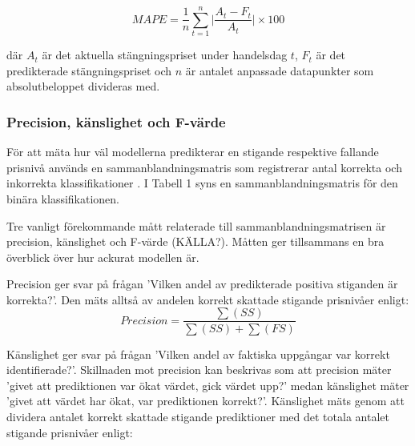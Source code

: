 \documentclass[12pt]{article}
\begin{document}
\begin{equation*}
    \textit{MAPE}=\frac{1}{n} 
    \sum_{t=1}^{n} \vert \frac{A_{t}-F_{t}}{A_{t}} \vert \times 100
\end{equation*}

där $A_{t}$ är det aktuella stängningspriset under handelsdag $t$, $F_{t}$ är det predikterade stängningspriset och $n$ är antalet anpassade datapunkter som absolutbeloppet divideras med. 

\subsubsection{Precision, känslighet och F-värde}
För att mäta hur väl modellerna predikterar en stigande respektive fallande prisnivå används en sammanblandningsmatris som registrerar antal korrekta och inkorrekta klassifikationer \parencite{ModelValidation}. I Tabell 1 syns en sammanblandningsmatris för den binära klassifikationen. 

\begin{table}[H]
\caption{Binär klassifikation}
\end{table}

Tre vanligt förekommande mått relaterade till sammanblandningsmatrisen är precision, känslighet och F-värde (KÄLLA?). Måtten ger tillsammans en bra överblick över hur ackurat modellen är.

\par Precision ger svar på frågan 'Vilken andel av predikterade positiva stiganden är korrekta?'. Den mäts alltså av andelen korrekt skattade stigande prisnivåer enligt:
\begin{equation}
    \textit{Precision} = \frac{\sum(SS)}{\sum(SS)+\sum(FS)} 
\end{equation}

Känslighet ger svar på frågan 'Vilken andel av faktiska uppgångar var korrekt identifierade?'. Skillnaden mot precision kan beskrivas som att precision mäter 'givet att prediktionen var ökat värdet, gick värdet upp?' medan känslighet mäter 'givet att värdet har ökat, var prediktionen korrekt?'. Känslighet mäts genom att dividera antalet korrekt skattade stigande prediktioner med det totala antalet stigande prisnivåer enligt:
\end{document}
